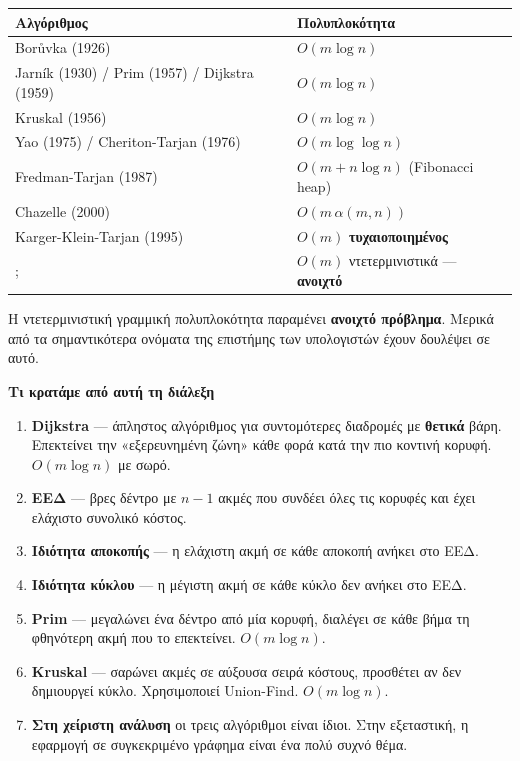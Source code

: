\documentclass[11pt,a4paper]{article}
\begin{document}
\begin{center}
\begin{tabular}{@{}l l@{}}
\toprule
Αλγόριθμος & Πολυπλοκότητα \\
\midrule
Borůvka (1926)                                & $O(m \log n)$ \\
Jarník (1930) / Prim (1957) / Dijkstra (1959) & $O(m \log n)$ \\
Kruskal (1956)                                & $O(m \log n)$ \\
Yao (1975) / Cheriton-Tarjan (1976)           & $O(m \log \log n)$ \\
Fredman-Tarjan (1987)                         & $O(m + n \log n)$ (Fibonacci heap) \\
Chazelle (2000)                               & $O(m \, \alpha(m, n))$ \\
Karger-Klein-Tarjan (1995)                    & $O(m)$ \textbf{τυχαιοποιημένος} \\
;                                             & $O(m)$ ντετερμινιστικά --- \textbf{ανοιχτό} \\
\bottomrule
\end{tabular}
\end{center}

Η ντετερμινιστική γραμμική πολυπλοκότητα παραμένει \textbf{ανοιχτό πρόβλημα}.
Μερικά από τα σημαντικότερα ονόματα της επιστήμης των υπολογιστών έχουν δουλέψει
σε αυτό.

\begin{recapbox}
\textbf{Τι κρατάμε από αυτή τη διάλεξη}
\begin{enumerate}
  \item \textbf{Dijkstra} --- άπληστος αλγόριθμος για συντομότερες διαδρομές με
  \textbf{θετικά} βάρη. Επεκτείνει την «εξερευνημένη ζώνη» κάθε φορά κατά την πιο
  κοντινή κορυφή. $O(m \log n)$ με σωρό.
  \item \textbf{ΕΕΔ} --- βρες δέντρο με $n - 1$ ακμές που συνδέει όλες τις
  κορυφές και έχει ελάχιστο συνολικό κόστος.
  \item \textbf{Ιδιότητα αποκοπής} --- η ελάχιστη ακμή σε κάθε αποκοπή ανήκει
  στο ΕΕΔ.
  \item \textbf{Ιδιότητα κύκλου} --- η μέγιστη ακμή σε κάθε κύκλο δεν ανήκει στο
  ΕΕΔ.
  \item \textbf{Prim} --- μεγαλώνει ένα δέντρο από μία κορυφή, διαλέγει σε κάθε
  βήμα τη φθηνότερη ακμή που το επεκτείνει. $O(m \log n)$.
  \item \textbf{Kruskal} --- σαρώνει ακμές σε αύξουσα σειρά κόστους, προσθέτει
  αν δεν δημιουργεί κύκλο. Χρησιμοποιεί Union-Find. $O(m \log n)$.
  \item \textbf{Στη χείριστη ανάλυση} οι τρεις αλγόριθμοι είναι ίδιοι. Στην
  εξεταστική, η εφαρμογή σε συγκεκριμένο γράφημα είναι ένα πολύ συχνό θέμα.
\end{enumerate}
\end{recapbox}

\lecturefooter
\end{document}
